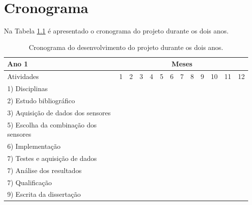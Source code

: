 \documentclass[acronym, symbols, table]{fei}
\begin{document}
	\chapter{Cronograma}
	
		\newcommand{\X}{\cellcolor{grey}}
		
		Na Tabela \ref{tab:cronograma} é apresentado o cronograma do projeto durante os dois anos.
		
		\begin{table}[!htb]
			\centering
			\caption{Cronograma do desenvolvimento do projeto durante os dois anos.}\label{tab:cronograma}
			\begin{tabular}{>{\raggedright}p{}|c|c|c|c|c|c|c|c|c|c|c|c|}
				\cline{2-13}
				Ano 1 & \multicolumn{12}{c|}{Meses} \\ \hline
				Atividades                       				 &  1 &  2 &  3 &  4 &  5 &  6 &  7 &  8 &  9 & 10 & 11 & 12 \\ \hline \hline
				\small 1) Disciplinas   						 & \X & \X & \X & \X & \X & \X & \X & \X & \X & \X & \X & \X \\ \hline
				\small 2) Estudo bibliográfico   				 & \X & \X & \X & \X & \X & \X & \X & \X & \X & \X & \X & \X \\ \hline
				\small 3) Aquisição de dados dos sensores        &    &    &    &    &    &    &    &    &    &    &    &    \\ \hline
				\small 5) Escolha da combinação dos sensores   	 &    &    &    &    &    &    &    &    &    &    &    &    \\ \hline
				\small 6) Implementação 		                 &    &    &    &    &    &    &    &    &    &    &    &    \\ \hline
				\small 7) Testes e aquisição de dados   		 &    &    &    &    &    &    &    &    &    &    &    &    \\ \hline
				\small 7) Análise dos resultados   			 	 &    &    &    &    &    &    &    &    &    &    &    &    \\ \hline
				\small 7) Qualificação   			 	 		 &    &    &    &    &    &    &    &    &    &    &    &    \\ \hline
				\small 9) Escrita da dissertação   				 &    &    &    &    &    &    &    &    &    & \X & \X & \X \\ \hline				
			\end{tabular}
			
			\hfill\break
			

\end{table}
\end{document}

